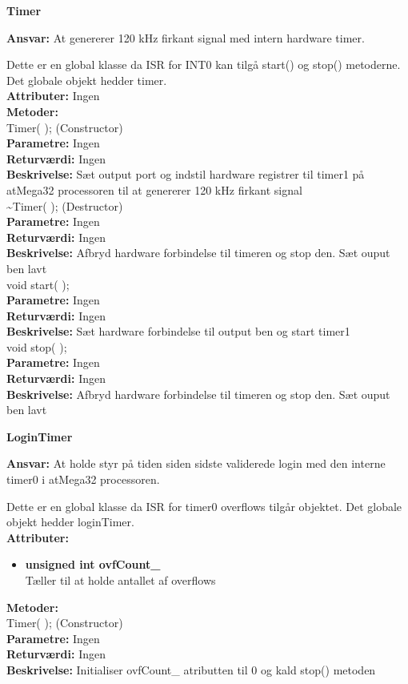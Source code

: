 %
%
{\centering
\textbf{Timer}\par
}
\textbf{Ansvar:} At genererer 120 kHz firkant signal med intern hardware timer.

Dette er en global klasse da ISR for INT0 kan tilgå start() og stop() metoderne. Det globale objekt hedder timer. \\
\textbf{Attributer:} Ingen \\
\textbf{Metoder:} \\
Timer( ); (Constructor) \\
\textbf{Parametre:} Ingen \\
\textbf{Returværdi:} Ingen \\
\textbf{Beskrivelse:} Sæt output port og indstil hardware registrer til timer1 på atMega32 processoren til at genererer 120 kHz firkant signal \\

\textasciitilde Timer( ); (Destructor) \\
\textbf{Parametre:} Ingen \\
\textbf{Returværdi:} Ingen \\
\textbf{Beskrivelse:} Afbryd hardware forbindelse til timeren og stop den. Sæt ouput ben lavt \\

void start( ); \\
\textbf{Parametre:} Ingen \\
\textbf{Returværdi:} Ingen \\
\textbf{Beskrivelse:} Sæt hardware forbindelse til output ben og start timer1 \\

void stop( ); \\
\textbf{Parametre:} Ingen \\
\textbf{Returværdi:} Ingen \\
\textbf{Beskrivelse:} Afbryd hardware forbindelse til timeren og stop den. Sæt ouput ben lavt \\

%
%
{\centering
\textbf{LoginTimer}\par
}
\textbf{Ansvar:} At holde styr på tiden siden sidste validerede login med den interne timer0 i atMega32 processoren.

Dette er en global klasse da ISR for timer0 overflows tilgår objektet. Det globale objekt hedder loginTimer. \\
\textbf{Attributer:}
\begin{itemize}
	\item \textbf{unsigned int ovfCount\_} \\
	Tæller til at holde antallet af overflows
\end{itemize}
\textbf{Metoder:} \\
Timer( ); (Constructor) \\
\textbf{Parametre:} Ingen \\
\textbf{Returværdi:} Ingen \\
\textbf{Beskrivelse:} Initialiser ovfCount\_ atributten til 0 og kald stop() metoden \\

